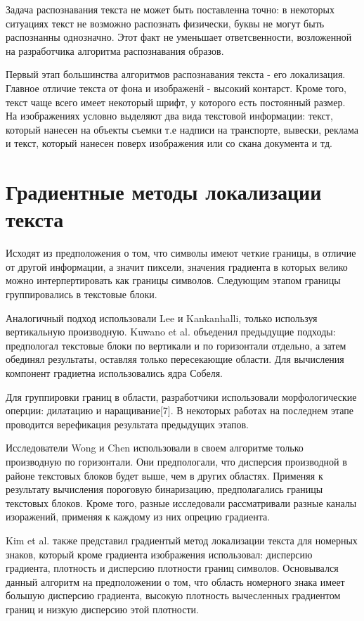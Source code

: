 \documentclass[oneside,final,14pt]{extreport}
\begin{document}
Задача распознавания текста не может быть поставленна точно: в некоторых ситуациях текст не возможно распознать физически, буквы не могут быть распознанны однозначно. Этот факт не уменьшает ответсвенности, возложенной на разработчика алгоритма распознавания образов.

Первый   этап большинства алгоритмов распознавания текста - его локализация. Главное отличие текста от фона и изображенй - высокий контарст. Кроме того, текст чаще всего имеет некоторый шрифт, у которого есть постоянный размер. На изображениях  условно выделяют два вида текстовой информации: текст, который нанесен на объекты съемки т.е надписи на транспорте, вывески, реклама и текст, который нанесен поверх изображения или со скана документа и тд. 

\section{Градиентные методы локализации текста}

Исходят из предположения о том, что символы имеют четкие границы, в отличие от другой информации, а значит пиксели, значения градиента в которых велико можно интерпертировать как границы символов. Следующим этапом границы группировались в текстовые блоки.

Аналогичный подход использовали Lee и Kankanhalli, только используя вертикальную производную. Kuwano et al. объеденил предыдущие подходы: предпологал текстовые блоки по вертикали и по горизонтали отдельно, а затем обединял результаты, оставляя только пересекающие области. Для вычисления компонент градиетна использовались ядра Собеля. 

	Для группировки границ в области, разработчики использовали морфологические оперции: дилатацию и наращивание[7].  В некоторых работах на последнем этапе проводится верефикация результата предыдущих этапов.

Исследователи Wong и Chen использовали в своем алгоритме только производную по горизонтали. Они предпологали, что дисперсия производной в районе текстовых блоков будет выше, чем в других областях.  Применяя к результату вычисления пороговую бинаризацию, предполагались границы текстовых блоков.  Кроме того, разные исследовали рассматривали разные каналы изоражений, применяя к каждому из них опрецию градиента.

Kim et al. также представил градиентый метод локализации текста для номерных знаков, который кроме градиента изображения использовал: дисперсию градиента, плотность и дисперсию плотности границ символов. Основывался данный алгоритм на предположении о том, что область номерного знака имеет большую дисперсию градиента, высокую плотность вычесленных градиентом границ и низкую дисперсию этой плотности.
\end{document}
